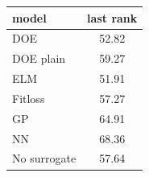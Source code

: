 \begin{tabular}{|lc|}
\hline
model & last rank\\
\hline
DOE & 52.82 \\
DOE plain & 59.27 \\
ELM & 51.91 \\
Fitloss & 57.27 \\
GP & 64.91 \\
NN & 68.36 \\
No surrogate & 57.64 \\
\hline
\end{tabular}
